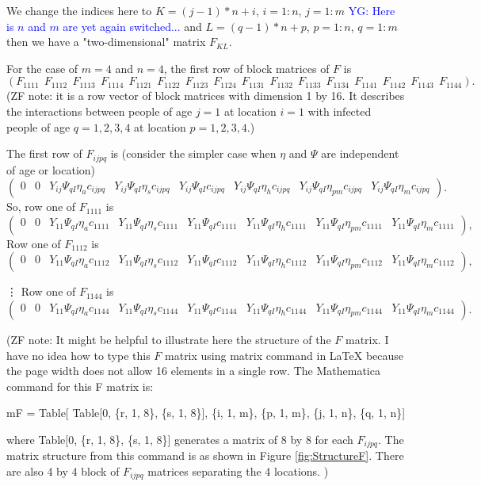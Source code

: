 \documentclass[12pt]{amsart}
\theoremstyle{definition}
\begin{document}
We change the indices here to $K=(j-1)*n+i$, $i=1:n$, $j=1:m$ \textcolor{blue}{YG: Here is $n$ and $m$ are yet again switched...}  and $L=(q-1)*n+p$, $p=1:n$, $q=1:m$ then we have a "two-dimensional" matrix $F_{KL}$.

For the case of $m=4$ and $n=4$,
the first row  of block matrices of  $F$  is 
\tiny{
\[
(F_{1111} \ \ F_{1112} \ \ F_{1113} \  \ F_{1114} \  \
F_{1121} \ \  F_{1122} \ \ F_{1123}  \ \ F_{1124}   \ \
F_{1131} \ \   F_{1132} \ \  F_{1133} \ \  F_{1134} \ \
F_{1141} \ \   F_{1142} \ \  F_{1143} \ \  F_{1144}).
\]
}
{\color{red}(ZF note: it is a row vector of block matrices with dimension 1 by 16. It describes the interactions between people of age $j=1$ at location $i=1$ with infected people of age $q=1,2,3,4$ at location $p=1,2,3,4$.)}

The first row  of   $F_{ijpq}$  is
(consider the simpler case when $\eta$ and $\Psi$ are independent of age or location)
\tiny{
\begin{equation}\label{F-def-1}
\begin{pmatrix} 
0 & 0 & Y_{ij}\Psi_{qI}\eta_{a}c_{ijpq} & Y_{ij}\Psi_{qI}\eta_{s}c_{ijpq} &Y_{ij}\Psi_{qI}c_{ijpq} 
&Y_{ij}\Psi_{qI}\eta_{h}c_{ijpq}  &
Y_{ij}\Psi_{qI}\eta_{pm}c_{ijpq}  & Y_{ij}\Psi_{qI}\eta_{m}c_{ijpq}  
\end{pmatrix}.
\end{equation}
} %
So, row one of $F_{1111}$ is
\tiny{
\[
\begin{pmatrix}
0 & 0 & Y_{11}\Psi_{qI}\eta_{a}c_{1111} &
Y_{11}\Psi_{qI}\eta_{s}c_{1111} &
Y_{11}\Psi_{qI}c_{1111} &
Y_{11}\Psi_{qI}\eta_{h}c_{1111} &
Y_{11}\Psi_{qI}\eta_{pm}c_{1111} &
Y_{11}\Psi_{qI}\eta_{m}c_{1111}
\end{pmatrix},
\]
}
Row one of $F_{1112}$ is
\tiny{\[
\begin{pmatrix}
0 & 0 & Y_{11}\Psi_{qI}\eta_{a}c_{1112} &
Y_{11}\Psi_{qI}\eta_{s}c_{1112} &
Y_{11}\Psi_{qI}c_{1112} &
Y_{11}\Psi_{qI}\eta_{h}c_{1112} &
Y_{11}\Psi_{qI}\eta_{pm}c_{1112} &
Y_{11}\Psi_{qI}\eta_{m}c_{1112}
\end{pmatrix},
\]
}

\vdots
\noindent
Row one of $F_{1144}$ is
\tiny{\[
\begin{pmatrix}
0 & 0 & Y_{11}\Psi_{qI}\eta_{a}c_{1144} &
Y_{11}\Psi_{qI}\eta_{s}c_{1144} &
Y_{11}\Psi_{qI}c_{1144} &
Y_{11}\Psi_{qI}\eta_{h}c_{1144} &
Y_{11}\Psi_{qI}\eta_{pm}c_{1144} &
Y_{11}\Psi_{qI}\eta_{m}c_{1144}
\end{pmatrix}.
\]
}

{\color{red}(ZF note: It might be helpful to illustrate here the structure of the $F$ matrix. I have no idea how to type this $F$ matrix using matrix command in LaTeX because the page width does not allow 16 elements in a single row.
The Mathematica command for this F matrix is: 

mF = Table[
   Table[0, \{r, 1, 8\}, \{s, 1, 8\}], \{i, 1, m\}, \{p, 1, m\}, \{j, 1, 
    n\}, \{q, 1, n\}]
    
where Table[0, \{r, 1, 8\}, \{s, 1, 8\}] generates a matrix of 8 by 8 for each $F_{ijpq}$. The matrix structure  from this command is as shown in Figure \ref{fig:StructureF}. There are also 4 by 4 block of $F_{ijpq}$ matrices separating the 4 locations.
)}
\end{document}
